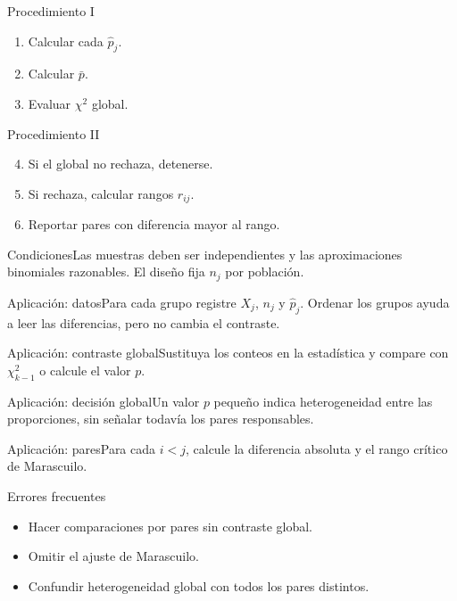 \documentclass[10pt,aspectratio=169]{beamer}
\begin{document}
\begin{frame}{Procedimiento I}\small\begin{enumerate}\item Calcular cada $\hat p_j$.\item Calcular $\bar p$.\item Evaluar $\chi^2$ global.\end{enumerate}\end{frame}
\begin{frame}{Procedimiento II}\small\begin{enumerate}\setcounter{enumi}{3}\item Si el global no rechaza, detenerse.\item Si rechaza, calcular rangos $r_{ij}$.\item Reportar pares con diferencia mayor al rango.\end{enumerate}\end{frame}
\begin{frame}{Condiciones}\small Las muestras deben ser independientes y las aproximaciones binomiales razonables. El diseño fija $n_j$ por población.\end{frame}
\begin{frame}{Aplicación: datos}\small Para cada grupo registre $X_j$, $n_j$ y $\hat p_j$. Ordenar los grupos ayuda a leer las diferencias, pero no cambia el contraste.\end{frame}
\begin{frame}{Aplicación: contraste global}\small Sustituya los conteos en la estadística y compare con $\chi^2_{k-1}$ o calcule el valor $p$.\end{frame}
\begin{frame}{Aplicación: decisión global}\small Un valor $p$ pequeño indica heterogeneidad entre las proporciones, sin señalar todavía los pares responsables.\end{frame}
\begin{frame}{Aplicación: pares}\small Para cada $i<j$, calcule la diferencia absoluta y el rango crítico de Marascuilo.\end{frame}
\begin{frame}{Errores frecuentes}\small\begin{itemize}\item Hacer comparaciones por pares sin contraste global.\item Omitir el ajuste de Marascuilo.\item Confundir heterogeneidad global con todos los pares distintos.\end{itemize}\end{frame}
\end{document}
